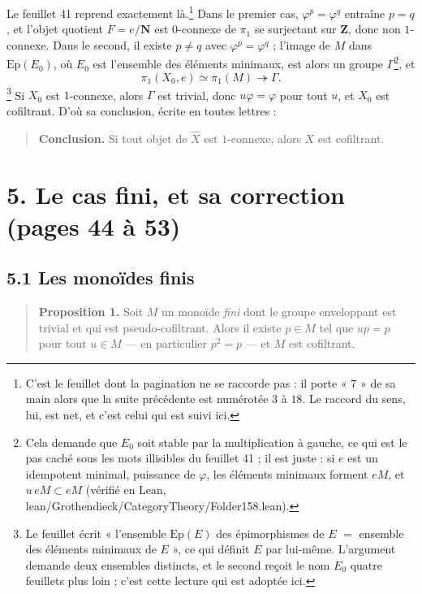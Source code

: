 \documentclass[11pt,a4paper]{article}
\begin{document}
Le feuillet 41 reprend exactement là.\footnote{C'est le feuillet dont la
pagination ne se raccorde pas : il porte « $7$ » de sa main alors que la suite
précédente est numérotée $3$ à $18$. Le raccord du sens, lui, est net, et
c'est celui qui est suivi ici.} Dans le premier cas,
$\varphi^{p} = \varphi^{q}$ entraîne $p = q$, et l'objet quotient
$F = e/\mathbf{N}$ est $0$-connexe de $\pi_{1}$ se surjectant sur $\mathbf{Z}$,
donc non $1$-connexe. Dans le second, il existe $p \neq q$ avec
$\varphi^{p} = \varphi^{q}$ ; l'image de $M$ dans $\mathrm{Ep}(E_{0})$, où
$E_{0}$ est l'ensemble des éléments minimaux, est alors un groupe $\Gamma$\footnote{Cela
demande que $E_0$ soit stable par la multiplication à gauche, ce qui est le
pas caché sous les mots illisibles du feuillet 41 ; il est juste : si $e$ est
un idempotent minimal, puissance de $\varphi$, les éléments minimaux forment
$eM$, et $u\,eM \subset eM$ (vérifié en Lean,
lean/Grothendieck/CategoryTheory/Folder158.lean).}, et
\[
  \pi_{1}(X_{0}, e) \simeq \pi_{1}(M) \twoheadrightarrow \Gamma .
\]
\footnote{Le feuillet écrit « l'ensemble $\mathrm{Ep}(E)$ des épimorphismes de
$E$ $=$ ensemble des éléments minimaux de $E$ », ce qui définit $E$ par
lui-même. L'argument demande deux ensembles distincts, et le second reçoit le
nom $E_{0}$ quatre feuillets plus loin ; c'est cette lecture qui est adoptée
ici.} Si $X_{0}$ est $1$-connexe, alors $\Gamma$ est trivial, donc
$u\varphi = \varphi$ pour tout $u$, et $X_{0}$ est cofiltrant. D'où sa
conclusion, écrite en toutes lettres :

\begin{quote}
\textbf{Conclusion.} Si tout objet de $\widehat{X}$ est $1$-connexe, alors $X$
est cofiltrant.
\end{quote}

\section*{5. Le cas fini, et sa correction (pages 44 à 53)}

\subsection*{5.1 Les monoïdes finis}

\begin{quote}
\textbf{Proposition 1.} Soit $M$ un monoïde \emph{fini} dont le groupe
enveloppant est trivial et qui est pseudo-cofiltrant. Alors il existe
$p \in M$ tel que $up = p$ pour tout $u \in M$ — en particulier
$p^{2} = p$ — et $M$ est cofiltrant.
\end{quote}
\end{document}
